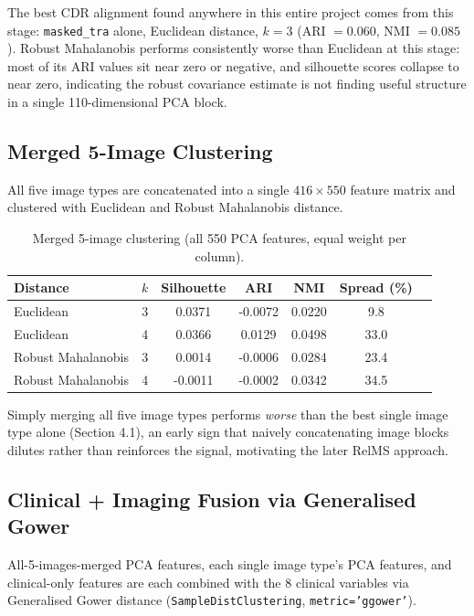 \documentclass[11pt, a4paper]{article}
\begin{document}
\noindent The best CDR alignment found anywhere in this entire project comes from this stage:
\texttt{masked\_tra} alone, Euclidean distance, $k=3$ (ARI $=0.060$, NMI $=0.085$). Robust
Mahalanobis performs consistently worse than Euclidean at this stage: most of its ARI values sit
near zero or negative, and silhouette scores collapse to near zero, indicating the robust covariance
estimate is not finding useful structure in a single 110-dimensional PCA block.

\subsection{Merged 5-Image Clustering}

All five image types are concatenated into a single $416\times550$ feature matrix and clustered
with Euclidean and Robust Mahalanobis distance.

\begin{table}[H]
\centering
\caption{Merged 5-image clustering (all 550 PCA features, equal weight per column).}
\begin{tabular}{lcccccc}
\toprule
\textbf{Distance} & $k$ & \textbf{Silhouette} & \textbf{ARI} & \textbf{NMI} & \textbf{Spread (\%)} \\
\midrule
Euclidean & 3 & 0.0371 & -0.0072 & 0.0220 & 9.8 \\
Euclidean & 4 & 0.0366 & 0.0129 & 0.0498 & 33.0 \\
Robust Mahalanobis & 3 & 0.0014 & -0.0006 & 0.0284 & 23.4 \\
Robust Mahalanobis & 4 & -0.0011 & -0.0002 & 0.0342 & 34.5 \\
\bottomrule
\end{tabular}
\end{table}

\noindent Simply merging all five image types performs \emph{worse} than the best single image type
alone (Section 4.1), an early sign that naively concatenating image blocks dilutes rather than
reinforces the signal, motivating the later RelMS approach.

\subsection{Clinical + Imaging Fusion via Generalised Gower}
\label{sec:ggower}

All-5-images-merged PCA features, each single image type's PCA features, and clinical-only
features are each combined with the 8 clinical variables via Generalised Gower distance
(\texttt{SampleDistClustering}, \texttt{metric='ggower'}).
\end{document}
